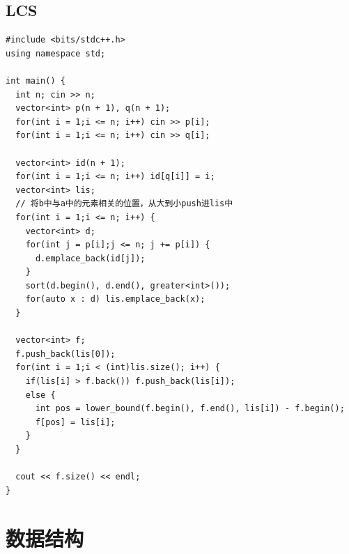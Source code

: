\documentclass[twoside]{article}
\begin{document}
\subsection{LCS}
\begin{lstlisting}
#include <bits/stdc++.h>
using namespace std;

int main() {
  int n; cin >> n;
  vector<int> p(n + 1), q(n + 1);
  for(int i = 1;i <= n; i++) cin >> p[i];
  for(int i = 1;i <= n; i++) cin >> q[i];
  
  vector<int> id(n + 1);
  for(int i = 1;i <= n; i++) id[q[i]] = i;
  vector<int> lis;
  // 将b中与a中的元素相关的位置，从大到小push进lis中
  for(int i = 1;i <= n; i++) {
    vector<int> d;
    for(int j = p[i];j <= n; j += p[i]) {
      d.emplace_back(id[j]);
    }
    sort(d.begin(), d.end(), greater<int>());
    for(auto x : d) lis.emplace_back(x);
  }
   
  vector<int> f;
  f.push_back(lis[0]);
  for(int i = 1;i < (int)lis.size(); i++) {
    if(lis[i] > f.back()) f.push_back(lis[i]);
    else {
      int pos = lower_bound(f.begin(), f.end(), lis[i]) - f.begin();
      f[pos] = lis[i];
    }
  }
  
  cout << f.size() << endl;
}
\end{lstlisting}
\clearpage\section{数据结构}
\end{document}
